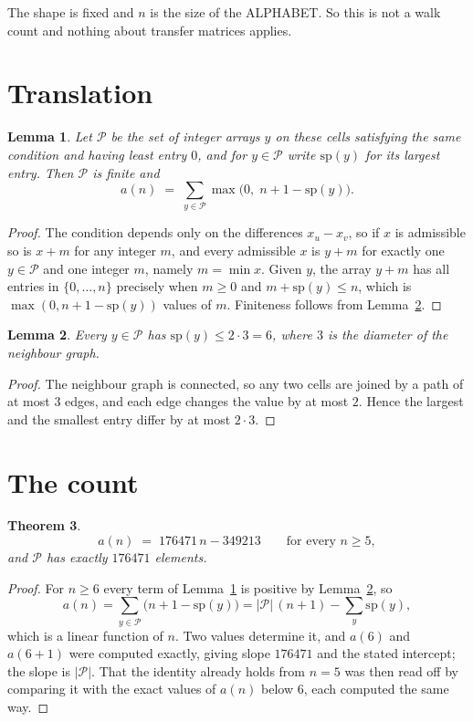\documentclass[11pt,a4paper]{article}
\theoremstyle{plain}
\newtheorem{theorem}{Theorem}
\newtheorem{lemma}[theorem]{Lemma}
\theoremstyle{definition}
\begin{document}
The shape is fixed and $n$ is the size of the ALPHABET. So this is not a walk count and
nothing about transfer matrices applies.

\section{Translation}

\begin{lemma}\label{lem:trans}
Let $\mathcal P$ be the set of integer arrays $y$ on these cells satisfying the same condition
and having least entry $0$, and for $y\in\mathcal P$ write $\mathrm{sp}(y)$ for its largest
entry. Then $\mathcal P$ is finite and
\[
a(n)\;=\;\sum_{y\in\mathcal P}\max\bigl(0,\;n+1-\mathrm{sp}(y)\bigr).
\]
\end{lemma}

\begin{proof}
The condition depends only on the differences $x_u-x_v$, so if $x$ is admissible so is $x+m$
for any integer $m$, and every admissible $x$ is $y+m$ for exactly one $y\in\mathcal P$ and one
integer $m$, namely $m=\min x$. Given $y$, the array $y+m$ has all entries in
$\{0,\dots,n\}$ precisely when $m\ge0$ and $m+\mathrm{sp}(y)\le n$, which is
$\max(0,n+1-\mathrm{sp}(y))$ values of $m$. Finiteness follows from
Lemma~\ref{lem:bound}.
\end{proof}

\begin{lemma}\label{lem:bound}
Every $y\in\mathcal P$ has $\mathrm{sp}(y)\le 2\cdot3=6$, where $3$ is the
diameter of the neighbour graph.
\end{lemma}

\begin{proof}
The neighbour graph is connected, so any two cells are joined by a path of at most $3$
edges, and each edge changes the value by at most $2$. Hence the largest and the smallest
entry differ by at most $2\cdot3$.
\end{proof}

\section{The count}

\begin{theorem}\label{thm:line}
\[
a(n)\;=\;176471\,n-349213\qquad\text{for every }n\ge5,
\]
and $\mathcal P$ has exactly $176471$ elements.
\end{theorem}

\begin{proof}
For $n\ge6$ every term of Lemma~\ref{lem:trans} is positive by
Lemma~\ref{lem:bound}, so
\[
a(n)=\sum_{y\in\mathcal P}\bigl(n+1-\mathrm{sp}(y)\bigr)
=|\mathcal P|\,(n+1)-\sum_{y}\mathrm{sp}(y),
\]
which is a linear function of $n$. Two values determine it, and $a(6)$ and
$a(6+1)$ were computed exactly, giving slope $176471$ and the stated intercept; the slope
is $|\mathcal P|$. That the identity already holds from $n=5$ was then read off by
comparing it with the exact values of $a(n)$ below $6$, each computed the same way.
\end{proof}
\end{document}
